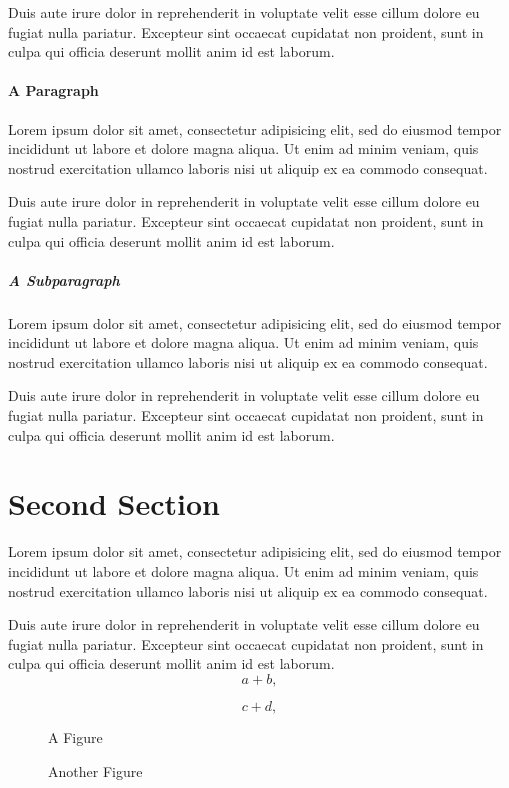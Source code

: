 \documentclass{report}
\begin{document}
Duis aute irure dolor in reprehenderit in voluptate velit esse cillum dolore eu fugiat nulla pariatur. Excepteur sint occaecat cupidatat non proident, sunt in culpa qui officia deserunt mollit anim id est laborum.

\paragraph{A Paragraph}
Lorem ipsum dolor sit amet, consectetur adipisicing elit, sed do eiusmod tempor incididunt ut labore et dolore magna aliqua. Ut enim ad minim veniam, quis nostrud exercitation ullamco laboris nisi ut aliquip ex ea commodo consequat.

Duis aute irure dolor in reprehenderit in voluptate velit esse cillum dolore eu fugiat nulla pariatur. Excepteur sint occaecat cupidatat non proident, sunt in culpa qui officia deserunt mollit anim id est laborum.

\subparagraph{A Subparagraph}
Lorem ipsum dolor sit amet, consectetur adipisicing elit, sed do eiusmod tempor incididunt ut labore et dolore magna aliqua. Ut enim ad minim veniam, quis nostrud exercitation ullamco laboris nisi ut aliquip ex ea commodo consequat.

Duis aute irure dolor in reprehenderit in voluptate velit esse cillum dolore eu fugiat nulla pariatur. Excepteur sint occaecat cupidatat non proident, sunt in culpa qui officia deserunt mollit anim id est laborum.

\section{Second Section}
Lorem ipsum dolor sit amet, consectetur adipisicing elit, sed do eiusmod tempor incididunt ut labore et dolore magna aliqua. Ut enim ad minim veniam, quis nostrud exercitation ullamco laboris nisi ut aliquip ex ea commodo consequat.

Duis aute irure dolor in reprehenderit in voluptate velit esse cillum dolore eu fugiat nulla pariatur. Excepteur sint occaecat cupidatat non proident, sunt in culpa qui officia deserunt mollit anim id est laborum.
\begin{equation}
 a + b,
\end{equation}

\begin{equation}
 c + d,
\end{equation}

\begin{figure}
\begin{centering}
A Figure\\
\end{centering}
\caption{Another Figure}
\end{figure}
\end{document}
